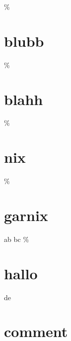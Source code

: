 \% \section{blubb}
\% \section{blahh} %
\% \section{nix} \% \section{garnix}
ab %
bc \% \section{hallo} %
de %

\section{%
  comment}

